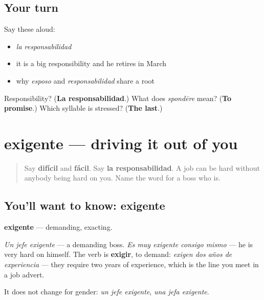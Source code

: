 \subsection*{Your turn}
Say these aloud:

\begin{itemize}
\raggedright
  \item \emph{la responsabilidad}
  \item it is a big responsibility and he retires in March
  \item why \emph{esposo} and \emph{responsabilidad} share a root
\end{itemize}

\begin{tcolorbox}[breakable,colback=teal!4,colframe=teal!35!black,title={Before you move on}]
Responsibility? (\textbf{La responsabilidad}.) What does \emph{spondēre} mean? (\textbf{To promise}.) Which syllable is stressed? (\textbf{The last}.)
\end{tcolorbox}
\section[exigente]{exigente — driving it out of you}

\label{lesson:ES-C445-exigente}



\begin{quote}
Say \textbf{difícil} and \textbf{fácil}. Say \textbf{la responsabilidad}. A job can be hard without anybody being hard on you. Name the word for a boss who is.
\end{quote}

\subsection*{You'll want to know: exigente}
\textbf{exigente} — demanding, exacting.

\emph{Un jefe exigente} — a demanding boss. \emph{Es muy exigente consigo mismo} — he is very hard on himself. The verb is \textbf{exigir}, to demand: \emph{exigen dos años de experiencia} — they require two years of experience, which is the line you meet in a job advert.

It does not change for gender: \emph{un jefe exigente}, \emph{una jefa exigente}.

